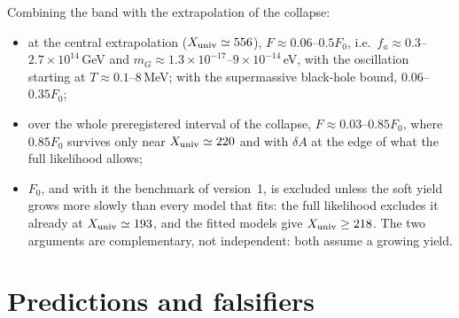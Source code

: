 \documentclass[11pt,a4paper]{article}
\newcommand{\dA}{\delta A}
\newcommand{\Xu}{X_{\rm univ}}
\begin{document}
Combining the band with the extrapolation of the collapse:
\begin{itemize}
\item at the central extrapolation ($\Xu\simeq556$), $F\approx0.06$--$0.5F_0$, i.e.\ $f_a\approx0.3$--$2.7\times10^{14}$\,GeV and $m_G\approx1.3\times10^{-17}$--$9\times10^{-14}$\,eV, with the oscillation starting at $T\approx0.1$--$8$\,MeV; with the supermassive black-hole bound, $0.06$--$0.35F_0$;
\item over the whole preregistered interval of the collapse, $F\approx0.03$--$0.85F_0$, where $0.85F_0$ survives only near $\Xu\simeq220$ and with $\dA$ at the edge of what the full likelihood allows;
\item $F_0$, and with it the benchmark of version~1, is excluded unless the soft yield grows more slowly than every model that fits: the full likelihood excludes it already at $\Xu\simeq193$, and the fitted models give $\Xu\ge218$. The two arguments are complementary, not independent: both assume a growing yield.
\end{itemize}

\section{Predictions and falsifiers}
\label{sec:predictions}
\end{document}
